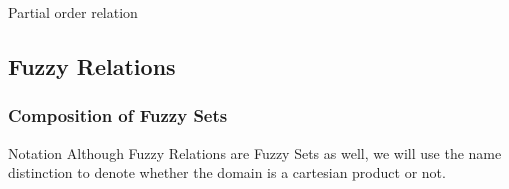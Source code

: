 
\begin{definition}
  Partial order relation
\end{definition}

\subsection{Fuzzy Relations}
\begin{definition*}
    
\end{definition*}

\begin{definition}
    
\end{definition}


\begin{definition*}

\end{definition*}

\begin{definition}

\end{definition}

\begin{definition}

\end{definition}

\subsubsection*{Composition of Fuzzy Sets}
\begin{notation}[label={not:compositionFS}]{Notation}
    Although Fuzzy Relations are Fuzzy Sets as well, we will use the name distinction to denote whether the domain is a cartesian product or not.
  \end{notation}
\begin{definition}
    
\end{definition}

\begin{definition}
    
\end{definition}